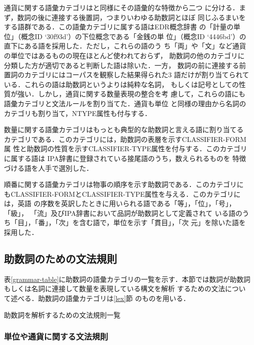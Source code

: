 \documentclass[japanese]{jnlp_1.4}
\begin{document}
通貨に関する語彙カテゴリは\cite{Bender}と同様にその語彙的な特徴から二つ
に分ける．まず，数詞の後に連接する後置詞，つまりいわゆる助数詞とほぼ
同じふるまいをする語群である．この語彙カテゴリに属する語はEDR概念辞書
の「計量の単位」（概念ID `30f93d'）の下位概念である「金銭の単
位」（概念ID `4446bd'）の直下にある語を採用した．ただし，これらの語のう
ち「両」や「文」など通貨の単位ではあるものの現在ほとんど使われておらず，
助数詞の他のカテゴリに分類した方が適切であると判断した語は除いた．一方，
数詞の前に連接する前置詞のカテゴリにはコーパスを観察した結果得られた3
語だけが割り当てられている．これらの語は助数詞というよりは純粋な名詞，
もしくは記号としての性質が強い．しかし，通貨に関する数量表現の整合を考
慮して，これらの語にも語彙カテゴリと文法ルールを割り当てた．通貨も単位
と同様の理由から名詞のカテゴリも割り当て，NTYPE属性も付与する．

数量に関する語彙カテゴリはもっとも典型的な助数詞と言える語に割り当てる
カテゴリである．このカテゴリには，助数詞の表層を示すCLASSIFIER-FORM属
性と助数詞の性質を示すCLASSIFIER-TYPE属性を付与する．このカテゴリに属する語は
IPA辞書\cite{ipadicurl}に登録されている接尾語のうち，数えられるものを
特徴づける語を人手で選別した．

順番に関する語彙カテゴリは物事の順序を示す助数詞である．このカテゴリに
もCLASSIFIER-FORMとCLASSIFIER-TYPE属性を与える．このカテゴリには，英語
の序数を英訳したときに用いられる語である「等」，「位」，「号」，「級」，
「流」及びIPA辞書において品詞が助数詞として定義されて
いる語のうち「目」，「番」，「次」を含む語で，単位を示す「貫目」，「次
元」を除いた語を採用した．







\subsection{\label{grammar}助数詞のための文法規則}

表\ref{grammar-table}に助数詞の語彙カテゴリの一覧を示す．本節では数詞が助数詞もしくは名詞に連接して数量を表現している構文を解析
するための文法について述べる．助数詞の語彙カテゴリは\ref{lex}節
のものを用いる．

\begin{table}[b]
\caption{助数詞を解析するための文法規則一覧}
\label{grammar-table}

\end{table}

\subsubsection{単位や通貨に関する文法規則}
\end{document}
